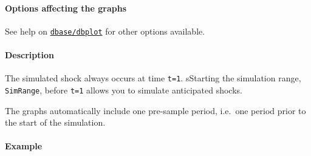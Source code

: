 \paragraph{Options affecting the
graphs}

See help on \href{dbase/dbplot}{\texttt{dbase/dbplot}} for other options
available.

\paragraph{Description}

The simulated shock always occurs at time \texttt{t=1}. sStarting the
simulation range, \texttt{SimRange}, before \texttt{t=1} allows you to
simulate anticipated shocks.

The graphs automatically include one pre-sample period, i.e.~one period
prior to the start of the simulation.

\paragraph{Example}


